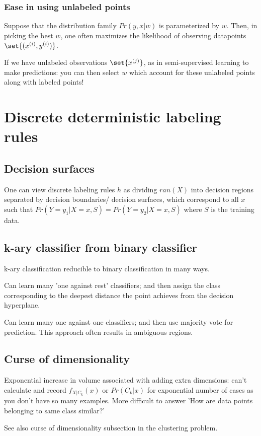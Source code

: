 \documentclass[oneside, article]{memoir}
\begin{document}
\subsubsection{Ease in using unlabeled points}
Suppose that the distribution family $Pr(y, x|w)$ is parameterized by $w$. Then, in picking the best $w$, one often maximizes the likelihood of observing datapoints $\set{(x^{(i)}, y^{(i)})}$.

If we have unlabeled observations $\set{x^{(j)}}$, as in semi-supervised learning to make predictions: you can then select $w$ which account for these unlabeled points along with labeled points!


\section{Discrete deterministic labeling rules}
\subsection{Decision surfaces}
One can view discrete labeling rules $h$ as dividing $ran(X)$ into decision regions separated by decision boundaries/ decision surfaces, which correspond to all $x$ such that $Pr(Y=y_1|X=x, S) = Pr(Y=y_2|X=x, S)$ where $S$ is the training data.

\subsection{k-ary classifier from binary classifier}
k-ary classification reducible to binary classification in many ways.

Can learn many 'one against rest' classifiers; and then assign the class corresponding to the deepest distance the point achieves from the decision hyperplane.

Can learn many one against one classifiers; and then use majority vote for prediction. This approach often results in ambiguous regions.

\subsection{Curse of dimensionality}
\tbc Exponential increase in volume associated with adding extra dimensions: can't calculate and record $f_{X|C_{k}}(x)$ or $Pr(C_{k}|x)$ for exponential number of cases as you don't have so many examples. More difficult to answer 'How are data points belonging to same class similar?'

See also curse of dimensionality subsection in the clustering problem.
\end{document}

